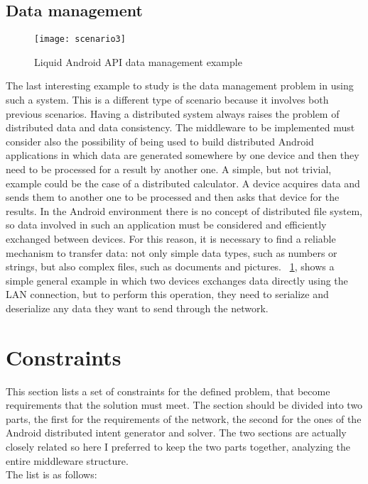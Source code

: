 \subsection{Data management}
\begin{figure}[h!]
	\centering
	\texttt{[image: scenario3]}
	\caption{Liquid Android API data management example}
	\label{fig:3.5}
\end{figure}
The last interesting example to study is the data management problem in using such a system. This is a different type of scenario because it involves both previous scenarios. Having a distributed system always raises the problem of distributed data and data consistency. The middleware to be implemented must consider also the possibility of being used to build distributed Android applications in which data are generated somewhere by one device and then they need to be processed for a result by another one. A simple, but not trivial, example could be the case of a distributed calculator. A device acquires data and sends them to another one to be processed and then asks that device for the results. In the Android environment there is no concept of distributed file system, so data involved in such an application must be considered and efficiently exchanged between devices. For this reason, it is necessary to find a reliable mechanism to transfer data: not only simple data types, such as numbers or strings, but also complex files, such as documents and pictures. \figurename~\ref{fig:3.5}, shows a simple general example in which two devices exchanges data directly using the LAN connection, but to perform this operation, they need to serialize and deserialize any data they want to send through the network. 

\section{Constraints} \label{problemconstraints}
This section lists a set of constraints for the defined problem, that become requirements that the solution must meet. The section should be divided into two parts, the first for the requirements of the network, the second for the ones of the Android distributed intent generator and solver. The two sections are actually closely related so here I preferred to keep the two parts together, analyzing the entire middleware structure.\\ 
The list is as follows:

